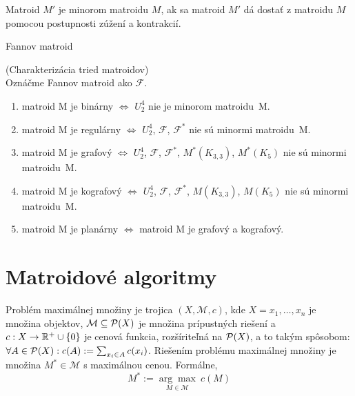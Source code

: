 \begin{definition}
Matroid $M'$ je minorom matroidu $M$, ak sa matroid $M'$ dá dostať z matroidu $M$ pomocou postupnosti zúžení a kontrakcií.
\end{definition}

\TODO Fannov matroid

\begin{theorem_hard}{(Charakterizácia tried matroidov)}\\

Oznáčme Fannov matroid ako $\mathcal{F}$.

\begin{enumerate}
    \item matroid M je binárny $\Longleftrightarrow$ $U_2^4$ nie je minorom matroidu~M.
    \item matroid M je regulárny $\Longleftrightarrow$ $U_2^4$, $\mathcal{F}$, $\mathcal{F}^*$ nie sú minormi matroidu~M.
    \item matroid M je grafový $\Longleftrightarrow$ $U_2^4$, $\mathcal{F}$, $\mathcal{F}^*$, $M^*(K_{3,3})$, $M^*(K_{5})$ nie sú minormi matroidu~M.
    \item matroid M je kografový $\Longleftrightarrow$ $U_2^4$, $\mathcal{F}$, $\mathcal{F}^*$, $M(K_{3,3})$, $M(K_{5})$ nie sú minormi matroidu~M.
    \item matroid M je planárny $\Longleftrightarrow$ matroid M je grafový a kografový.
\end{enumerate}
\end{theorem_hard}


\section{Matroidové algoritmy}

\begin{definition}

Problém maximálnej množiny je trojica $(X, \mathcal{M}, c)$, kde 
$X = {x_1, \ldots, x_n}$ je množina objektov, 
$\mathcal{M} \subseteq \mathcal{P}(X)$ je množina prípustných riešení a $c: X \to \mathbb{R}^+ \cup \left\{0\right\}$
je cenová funkcia, rozšíriteľná na $\mathcal{P}(X)$, a to takým spôsobom: $\forall A \in \mathcal{P}(X): c(A) := \sum_{x_i \in A} c(x_i) $.
Riešením problému maximálnej množiny je množina $M^* \in \mathcal{M}$ s maximálnou cenou. Formálne,
$$M^* := \underset{M \in \mathcal{M}}{\arg\max}~c(M)$$

\end{definition}

